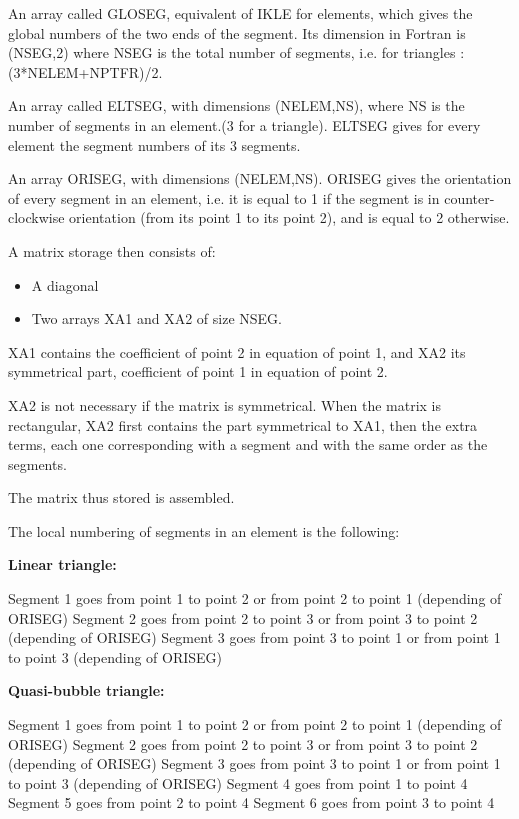 An array called GLOSEG, equivalent of IKLE for elements, which gives the global
numbers of the two ends of the segment. Its dimension in Fortran is (NSEG,2)
where NSEG is the total number of segments, i.e. for triangles :
(3*NELEM+NPTFR)/2.

An array called ELTSEG, with dimensions (NELEM,NS), where NS is the number of
segments in an element.(3 for a triangle). ELTSEG gives for every element the
segment numbers of its 3 segments.

An array ORISEG, with dimensions (NELEM,NS). ORISEG gives the orientation of
every segment in an element, i.e. it is equal to 1 if the segment is in
counter-clockwise orientation (from its point 1 to its point 2), and is equal
to 2 otherwise.

A matrix storage then consists of:
\begin{itemize}
  \item A diagonal
  \item Two arrays XA1 and XA2 of size NSEG.
\end{itemize}

XA1 contains the coefficient of point 2 in equation of point 1, and XA2 its
symmetrical part, coefficient of point 1 in equation of point 2.

XA2 is not necessary if the matrix is symmetrical. When the matrix is
rectangular, XA2 first contains the part symmetrical to XA1, then the extra
terms, each one corresponding with a segment and with the same order as the
segments.

The matrix thus stored is assembled.

The local numbering of segments in an element is the following:

\textbf{Linear triangle:}

Segment 1 goes from point 1 to point 2 or from point 2 to point 1 (depending of ORISEG)
Segment 2 goes from point 2 to point 3 or from point 3 to point 2 (depending of ORISEG)
Segment 3 goes from point 3 to point 1 or from point 1 to point 3 (depending of ORISEG)

\textbf{Quasi-bubble triangle:}

Segment 1 goes from point 1 to point 2 or from point 2 to point 1 (depending of ORISEG)
Segment 2 goes from point 2 to point 3 or from point 3 to point 2 (depending of ORISEG)
Segment 3 goes from point 3 to point 1 or from point 1 to point 3 (depending of ORISEG)
Segment 4 goes from point 1 to point 4
Segment 5 goes from point 2 to point 4
Segment 6 goes from point 3 to point 4

